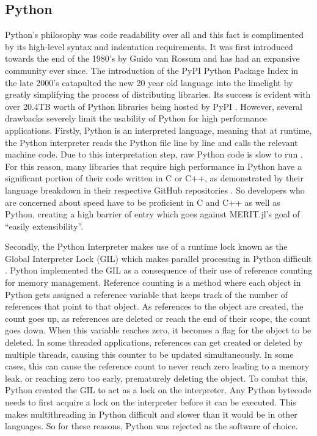 \subsection{Python}
Python's philosophy was code readability over all and this fact is complimented by its high-level syntax and indentation
requirements. It was first introduced towards the end of the 1980's by Guido van Rossum and has had an expansive
community ever since. The introduction of the PyPI Python Package Index in the late 2000's catapulted the new 20 year
old language into the limelight by greatly simplifying the process of distributing libraries. Its success is evident
with over 20.4TB worth of Python libraries being hosted by PyPI \cite{indexPyPIStatistics}. However, several drawbacks
severely limit the usability of Python for high performance applications. Firstly, Python is an interpreted language,
meaning that at runtime, the Python interpreter reads the Python file line by line and calls the relevant machine code.
Due to this interpretation step, raw Python code is slow to run \cite{baranyPythonInterpreterPerformance2014}. For this
reason, many libraries that require high performance in Python have a significant portion of their code written in C or
C++, as demonstrated by their language breakdown in their respective GitHub repositories \cite{Tensorflow,
paszkePyTorch}. So developers who are concerned about speed have to be proficient in C and C++ as well as Python,
creating a high barrier of entry which goes against MERIT.jl's  goal of ``easily extensibility''.

Secondly, the Python Interpreter makes use of a runtime lock known as the Global Interpreter Lock (GIL) which makes
parallel processing in Python difficult \cite{ajitsariaWhatPythonGlobal}. Python implemented the GIL as a consequence of
their use of reference counting for memory management. Reference counting is a method where each object in Python gets
assigned a reference variable that keeps track of the number of references that point to that object. As references to
the object are created, the count goes up, as references are deleted or reach the end of their scope, the count goes
down. When this variable reaches zero, it becomes a flag for the object to be deleted. In some threaded applications,
references can get created or deleted by multiple threads, causing this counter to be updated simultaneously. In some
cases, this can cause the reference count to never reach zero leading to a memory leak, or reaching zero too early,
prematurely deleting the object. To combat this, Python created the GIL to act as a lock on the interpreter. Any Python
bytecode needs to first acquire a lock on the interpreter before it can be executed. This makes multithreading in Python
difficult and slower than it would be in other languages. So for these reasons, Python was rejected as the software of
choice.

